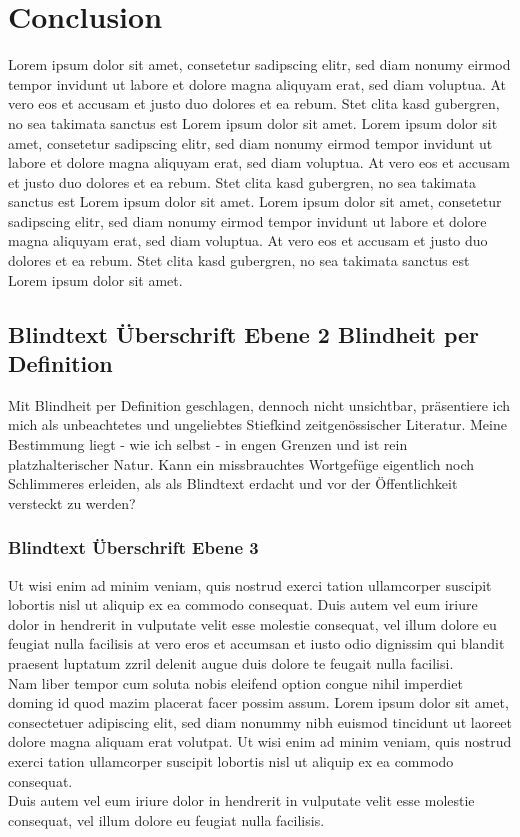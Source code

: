 \documentclass[
	english,
	ruledheaders=section,%
	class=report,%
	thesis={type=bachelor},%
	accentcolor=1b,%
	custommargins=true,%
	marginpar=false,%
	parskip=half-,%
	fontsize=11pt,%
	DIV=14,
]{tudapub}
\begin{document}
\chapter{Conclusion}
Lorem ipsum dolor sit amet, consetetur sadipscing elitr, sed diam nonumy eirmod tempor invidunt ut labore et dolore magna aliquyam erat, sed diam voluptua. At vero eos et accusam et justo duo dolores et ea rebum. Stet clita kasd gubergren, no sea takimata sanctus est Lorem ipsum dolor sit amet. Lorem ipsum dolor sit amet, consetetur sadipscing elitr, sed diam nonumy eirmod tempor invidunt ut labore et dolore magna aliquyam erat, sed diam voluptua. At vero eos et accusam et justo duo dolores et ea rebum. Stet clita kasd gubergren, no sea takimata sanctus est Lorem ipsum dolor sit amet. Lorem ipsum dolor sit amet, consetetur sadipscing elitr, sed diam nonumy eirmod tempor invidunt ut labore et dolore magna aliquyam erat, sed diam voluptua. At vero eos et accusam et justo duo dolores et ea rebum. Stet clita kasd gubergren, no sea takimata sanctus est Lorem ipsum dolor sit amet.
\section{Blindtext Überschrift Ebene 2 Blindheit per Definition}
Mit Blindheit per Definition geschlagen, dennoch nicht unsichtbar, präsentiere ich mich als unbeachtetes und ungeliebtes Stiefkind zeitgenössischer Literatur. Meine Bestimmung liegt - wie ich selbst - in engen Grenzen und ist rein platzhalterischer Natur. Kann ein missbrauchtes Wortgefüge eigentlich noch Schlimmeres erleiden, als als Blindtext erdacht und vor der Öffentlichkeit versteckt zu werden?
\subsection{Blindtext Überschrift Ebene 3}
Ut wisi enim ad minim veniam, quis nostrud exerci tation ullamcorper suscipit lobortis nisl ut aliquip ex ea commodo consequat. Duis autem vel eum iriure dolor in hendrerit in vulputate velit esse molestie consequat, vel illum dolore eu feugiat nulla facilisis at vero eros et accumsan et iusto odio dignissim qui blandit praesent luptatum zzril delenit augue duis dolore te feugait nulla facilisi.\\
Nam liber tempor cum soluta nobis eleifend option congue nihil imperdiet doming id quod mazim placerat facer possim assum. Lorem ipsum dolor sit amet, consectetuer adipiscing elit, sed diam nonummy nibh euismod tincidunt ut laoreet dolore magna aliquam erat volutpat. Ut wisi enim ad minim veniam, quis nostrud exerci tation ullamcorper suscipit lobortis nisl ut aliquip ex ea commodo consequat.\\
Duis autem vel eum iriure dolor in hendrerit in vulputate velit esse molestie consequat, vel illum dolore eu feugiat nulla facilisis.
\end{document}
